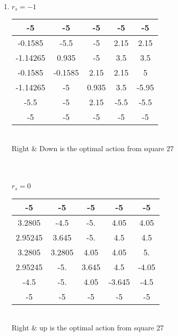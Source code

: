 \documentclass[11pt]{article}
\begin{document}
\begin{tcolorbox}[breakable]
\begin{enumerate}[label=(\alph*)]
    
    \item $r_s = -1$\\
    \begin{tabular}{ | c | c | c | c | c | }
    \hline
    -5     &  -5   &   -5    &   -5   &    -5 \\
    \hline
    -0.1585 & -5.5  &   -5    &   2.15 &    2.15   \\
    \hline
    -1.14265 &  0.935 &   -5    &   3.5  &    3.5    \\
    \hline
    -0.1585 & -0.1585 &   2.15  &   2.15 &    5     \\
    \hline
    -1.14265 & -5    &   0.935 &   3.5  &   -5.95   \\
    \hline
    -5.5    & -5    &  2.15   &  -5.5  &   -5.5    \\
    \hline
    -5     & -5    &  -5    &  -5   &   -5     \\
    \hline
    \end{tabular}
    \\ 
    Right \& Down is the optimal action from square 27\\
    \\
    \\
    \\
    $r_s = 0$\\ 
    \begin{tabular}{ | c | c | c | c | c | }
    \hline
    -5     &  -5   &   -5    &   -5   &    -5 \\
    \hline
    3.2805 & -4.5   &  -5.   &    4.05  &   4.05 \\
    \hline
    2.95245 & 3.645 &  -5.    &   4.5   &   4.5   \\
    \hline
    3.2805  & 3.2805 &  4.05  &   4.05  &   5.     \\
    \hline
    2.95245 &-5.    &   3.645  &  4.5   &  -4.05   \\
    \hline
    -4.5    & -5.   &    4.05  &  -3.645 &  -4.5   \\
    \hline
    -5     & -5    &  -5    &  -5   &   -5     \\
    \hline
    \end{tabular}\\ 
    Right \& up is the optimal action from square 27\\
    

\end{enumerate}
\end{tcolorbox}
\end{document}
